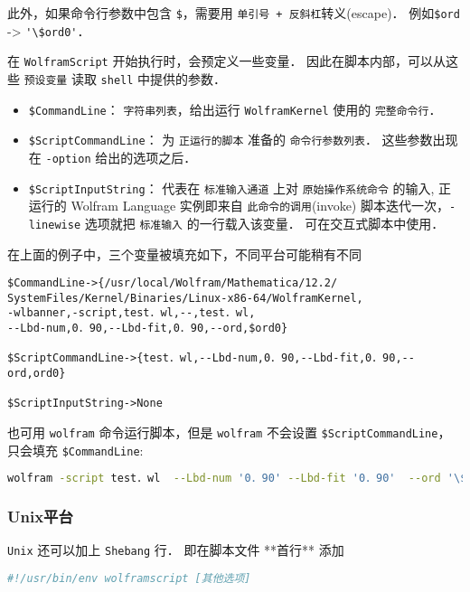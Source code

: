 此外，如果命令行参数中包含 \verb`$`，需要用 \verb`单引号 + 反斜杠`转义(escape)．
例如\verb`$ord` -> \verb`'\$ord0'`．

在 \verb`WolframScript` 开始执行时，会预定义一些变量．
因此在脚本内部，可以从这些 \verb`预设变量` 读取 \verb`shell` 中提供的参数．

\begin{itemize}
\item \verb`$CommandLine`： \verb`字符串列表`，给出运行 \verb`WolframKernel` 使用的 \verb`完整命令行`．
\item \verb`$ScriptCommandLine`： 为 \verb`正运行的脚本` 准备的 \verb`命令行参数列表`．
这些参数出现在 \verb`-option` 给出的选项之后．
\item \verb`$ScriptInputString`： 代表在 \verb`标准输入通道` 上对 \verb`原始操作系统命令` 的输入,
正运行的 Wolfram Language 实例即来自 \verb`此命令的调用`(invoke)
脚本迭代一次，\verb`-linewise` 选项就把 \verb`标准输入` 的一行载入该变量．
可在交互式脚本中使用．
\end{itemize}


在上面的例子中，三个变量被填充如下，不同平台可能稍有不同

\begin{lstlisting}
$CommandLine->{/usr/local/Wolfram/Mathematica/12.2/
SystemFiles/Kernel/Binaries/Linux-x86-64/WolframKernel,
-wlbanner,-script,test．wl,--,test．wl,
--Lbd-num,0．90,--Lbd-fit,0．90,--ord,$ord0}

$ScriptCommandLine->{test．wl,--Lbd-num,0．90,--Lbd-fit,0．90,--ord,ord0}

$ScriptInputString->None
\end{lstlisting}

也可用 \verb`wolfram` 命令运行脚本，但是 \verb`wolfram` 不会设置 \verb`$ScriptCommandLine`，只会填充 \verb`$CommandLine`:

\begin{lstlisting}[language=bash]
wolfram -script test．wl  --Lbd-num '0．90' --Lbd-fit '0．90'  --ord '\$ord0'
\end{lstlisting}

\subsubsection{Unix平台} 

\verb`Unix` 还可以加上 \verb`Shebang` 行． 即在脚本文件 **首行** 添加
\begin{lstlisting}[language=bash]
#!/usr/bin/env wolframscript [其他选项]
\end{lstlisting}


